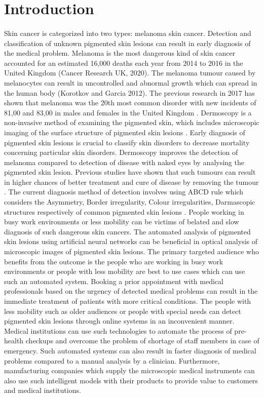 \section{Introduction}
\paragraph*{}

Skin cancer is categorized into two types: melanoma skin cancer. 
Detection and classification of unknown pigmented skin lesions can result in early diagnosis of the medical problem. Melanoma is the most dangerous kind of skin cancer accounted for an estimated 16,000 deaths each year from 2014 to 2016 in the United Kingdom (Cancer Research UK, 2020). The melanoma tumour caused by melanocytes can result in uncontrolled and abnormal growth which can spread in the human body (Korotkov and Garcia 2012).
The previous research in 2017 has shown that melanoma was the 20th most common disorder with new incidents of 81,00 and 83,00 in males and females in the United Kingdom \citep*{KOROTKOV201269}.
Dermoscopy is a non-invasive method of examining the pigmented skin, which includes microscopic imaging of the surface structure of pigmented skin lesions \citep*{KOROTKOV201269}.
Early diagnosis of pigmented skin lesions is crucial to classify skin disorders to decrease mortality concerning particular skin disorders. Dermoscopy improves the detection of melanoma compared to detection of disease with naked eyes by analysing the pigmented skin lesion. Previous studies have shown that such tumours can result in higher chances of better treatment and cure of disease by removing the tumour \citep*{CELEBI2007362}.
The current diagnosis method of detection involves using ABCD rule which considers the Asymmetry, Border irregularity, Colour irregularities, Darmascopic structures respectively of common pigmented skin lesions \citep*{LOESCHER2013170}.
People working in busy work environments or less mobility can be victims of belated and slow diagnosis of such dangerous skin cancers.
The automated analysis of pigmented skin lesions using artificial neural networks can be beneficial in optical analysis of microscopic images of pigmented skin lesions. 
The primary targeted audience who benefits from the outcome is the people who are working in busy work environments or people with less mobility are best to use cases which can use such an automated system. Booking a prior appointment with medical professionals based on the urgency of detected medical problems can result in the immediate treatment of patients with more critical conditions. The people with less mobility such as older audiences or people with special needs can detect pigmented skin lesions through online systems in an inconvenient manner. Medical institutions can use such technologies to automate the process of pre-health checkups and overcome the problem of shortage of staff members in case of emergency. Such automated systems can also result in faster diagnosis of medical problems compared to a manual analysis by a clinician. 
Furthermore, manufacturing companies which supply the microscopic medical instruments can also use such intelligent models with their products to provide value to customers and medical institutions.

